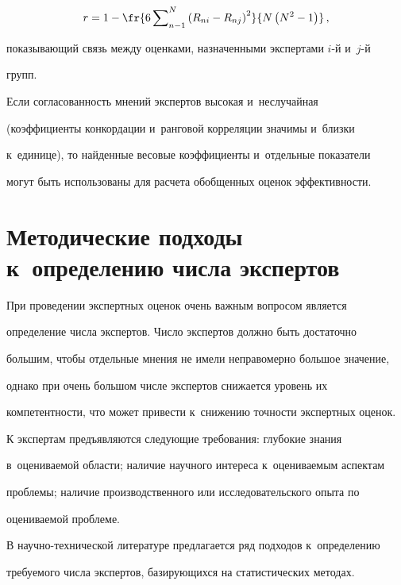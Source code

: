   \begin{equation*}

  r=1-\fr{6\sum\nolimits^N_{n-1} \left( R_{ni}-R_{nj}\right)^2} {N\left( N^2-

1\right)}\,,


  \end{equation*}

показывающий связь между оценками, назначенными экспертами $i$-й и~$j$-й 

групп. 



  Если согласованность мнений экспертов высокая и~неслучайная 

(коэффициенты конкордации и~ранговой корреляции значимы и~близки 

к~единице), то найденные весовые коэффициенты и~отдельные показатели 

могут быть использованы для расчета обобщенных оценок эффективности.



\section{Методические подходы к~определению числа экспертов}



  При проведении экспертных оценок очень важным вопросом является 

определение числа экспертов. Число экспертов должно быть достаточно 

большим, чтобы отдельные мнения не имели неправомерно большое значение, 

однако при очень большом числе экспертов снижается уровень их 

компетентности, что может привести к~снижению точности экспертных оценок.

  

  К экспертам предъявляются следующие требования: глубокие знания 

в~оцениваемой области; наличие научного интереса к~оцениваемым аспектам 

проблемы; наличие производственного или исследовательского опыта по 

оцениваемой проблеме.

  

  В научно-технической литературе предлагается ряд подходов к~определению 

требуемого числа экспертов, базирующихся на статистических методах.

